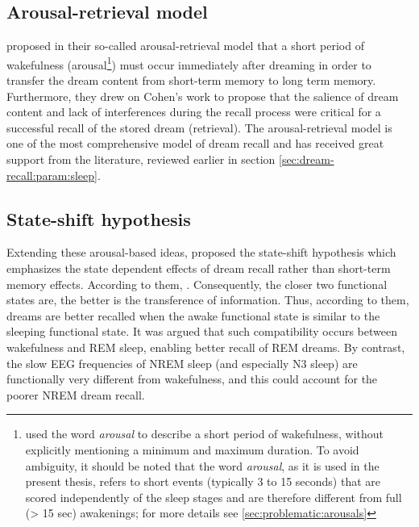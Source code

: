 \subsection{Arousal-retrieval model}
\label{sec:dream-recall:theories:arousal}

\citet{koulack_dream_1976} proposed in their so-called arousal-retrieval model that a short period of wakefulness (arousal\footnote{\citet{koulack_dream_1976} used the word \emph{arousal} to describe a short period of wakefulness, without explicitly mentioning a minimum and maximum duration. To avoid ambiguity, it should be noted that the word \emph{arousal}, as it is used in the present thesis, refers to short events (typically 3 to 15 seconds) that are scored independently of the sleep stages and are therefore different from full (> 15 sec) awakenings; for more details see \ref{sec:problematic:arousals}}) must occur immediately after dreaming in order to transfer the dream content from short-term memory to long term memory. Furthermore, they drew on Cohen’s work to propose that the salience of dream content and lack of interferences during the recall process were critical for a successful recall of the stored dream (retrieval). The arousal-retrieval model is one of the most comprehensive model of dream recall and has received great support from the literature, reviewed earlier in section \ref{sec:dream-recall:param:sleep}.

\subsection{State-shift hypothesis}
\label{sec:dream-recall:theories:state}

Extending these arousal-based ideas, \citet{koukkou_dreaming:_1983} proposed the state-shift hypothesis which emphasizes the state dependent effects of dream recall rather than short-term memory effects. According to them,  \citep{koukkou_dreaming:_1983}. Consequently, the closer two functional states are, the better is the transference of information. Thus, according to them, dreams are better recalled when the awake functional state is similar to the sleeping functional state. It was argued that such compatibility occurs between wakefulness and REM sleep, enabling better recall of REM dreams. By contrast, the slow EEG frequencies of NREM sleep (and especially N3 sleep) are functionally very different from wakefulness, and this could account for the poorer NREM dream recall.

